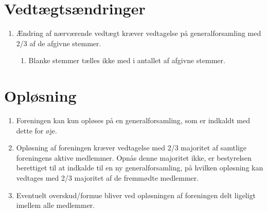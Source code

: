 \documentclass[a4paper, 10pt]{article}
\renewcommand\thesection{\textsection\arabic{section}}
\newenvironment{stykenum}{
  \begin{enumerate}[%
    label=Stk.~\arabic*:, ref=\textsection~\theenumi~Stk.~\arabic*, start=1]
}{\end{enumerate}}
\newenvironment{substykenum}{
  \begin{enumerate}[%
          label=Stk.~\arabic{enumi}.\arabic*:,
      ref=\thesection~Stk.~\arabic{enumi}.\arabic*, start=1]
}{\end{enumerate}}
\begin{document}
\section{Vedtægtsændringer}
\begin{stykenum}
    \item Ændring af nærværende vedtægt kræver vedtagelse på generalforsamling
        med 2/3 af de afgivne stemmer.
    \begin{substykenum}
        \item Blanke stemmer tælles ikke med i antallet af afgivne stemmer.
    \end{substykenum}
\end{stykenum}

\section{Opløsning}
\begin{stykenum}
    \item Foreningen kan kun opløses på en generalforsamling, som er indkaldt
        med dette for øje.

    \item Opløsning af foreningen kræver vedtagelse med 2/3 majoritet af
        samtlige foreningens aktive medlemmer. Opnås denne majoritet ikke, er
        bestyrelsen berettiget til at indkalde til en ny generalforsamling, på
        hvilken opløsning kan vedtages med 2/3 majoritet af de fremmødte
        medlemmer.

    \item Eventuelt overskud/formue bliver ved opløsningen af foreningen delt
        ligeligt imellem alle medlemmer.
\end{stykenum}
\end{document}
